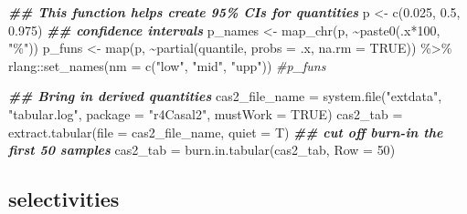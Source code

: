 \documentclass[
]{book}
\newenvironment{Shaded}{\begin{snugshade}}{\end{snugshade}}
\newcommand{\AttributeTok}[1]{\textcolor[rgb]{0.77,0.63,0.00}{#1}}
\newcommand{\CommentTok}[1]{\textcolor[rgb]{0.56,0.35,0.01}{\textit{#1}}}
\newcommand{\ConstantTok}[1]{\textcolor[rgb]{0.00,0.00,0.00}{#1}}
\newcommand{\DecValTok}[1]{\textcolor[rgb]{0.00,0.00,0.81}{#1}}
\newcommand{\DocumentationTok}[1]{\textcolor[rgb]{0.56,0.35,0.01}{\textbf{\textit{#1}}}}
\newcommand{\FloatTok}[1]{\textcolor[rgb]{0.00,0.00,0.81}{#1}}
\newcommand{\FunctionTok}[1]{\textcolor[rgb]{0.00,0.00,0.00}{#1}}
\newcommand{\NormalTok}[1]{#1}
\newcommand{\OtherTok}[1]{\textcolor[rgb]{0.56,0.35,0.01}{#1}}
\newcommand{\SpecialCharTok}[1]{\textcolor[rgb]{0.00,0.00,0.00}{#1}}
\newcommand{\StringTok}[1]{\textcolor[rgb]{0.31,0.60,0.02}{#1}}
\begin{document}
\begin{Shaded}
\begin{Highlighting}[]
\DocumentationTok{\#\# This function helps create 95\% CIs for quantities}
\NormalTok{p }\OtherTok{\textless{}{-}} \FunctionTok{c}\NormalTok{(}\FloatTok{0.025}\NormalTok{, }\FloatTok{0.5}\NormalTok{, }\FloatTok{0.975}\NormalTok{) }\DocumentationTok{\#\# confidence intervals}
\NormalTok{p\_names }\OtherTok{\textless{}{-}} \FunctionTok{map\_chr}\NormalTok{(p, }\SpecialCharTok{\textasciitilde{}}\FunctionTok{paste0}\NormalTok{(.x}\SpecialCharTok{*}\DecValTok{100}\NormalTok{, }\StringTok{"\%"}\NormalTok{))}
\NormalTok{p\_funs }\OtherTok{\textless{}{-}} \FunctionTok{map}\NormalTok{(p, }\SpecialCharTok{\textasciitilde{}}\FunctionTok{partial}\NormalTok{(quantile, }\AttributeTok{probs =}\NormalTok{ .x, }\AttributeTok{na.rm =} \ConstantTok{TRUE}\NormalTok{)) }\SpecialCharTok{\%\textgreater{}\%} 
\NormalTok{  rlang}\SpecialCharTok{::}\FunctionTok{set\_names}\NormalTok{(}\AttributeTok{nm =} \FunctionTok{c}\NormalTok{(}\StringTok{"low"}\NormalTok{, }\StringTok{"mid"}\NormalTok{, }\StringTok{"upp"}\NormalTok{))}
\CommentTok{\#p\_funs}

\DocumentationTok{\#\# Bring in derived quantities}
\NormalTok{cas2\_file\_name }\OtherTok{=} \FunctionTok{system.file}\NormalTok{(}\StringTok{"extdata"}\NormalTok{, }\StringTok{"tabular.log"}\NormalTok{, }\AttributeTok{package =} \StringTok{"r4Casal2"}\NormalTok{, }\AttributeTok{mustWork =} \ConstantTok{TRUE}\NormalTok{)}
\NormalTok{cas2\_tab }\OtherTok{=} \FunctionTok{extract.tabular}\NormalTok{(}\AttributeTok{file =}\NormalTok{ cas2\_file\_name, }\AttributeTok{quiet =}\NormalTok{ T)}
\DocumentationTok{\#\# cut off burn{-}in the first 50 samples}
\NormalTok{cas2\_tab }\OtherTok{=} \FunctionTok{burn.in.tabular}\NormalTok{(cas2\_tab, }\AttributeTok{Row =} \DecValTok{50}\NormalTok{)}
\end{Highlighting}
\end{Shaded}

\hypertarget{selectivities-1}{%
\subsection{selectivities}\label{selectivities-1}}
\end{document}
